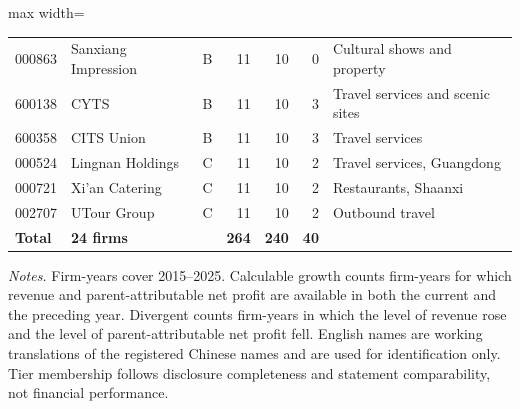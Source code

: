 \documentclass[review,3p,times]{elsarticle}
\begin{document}
\begin{table}[!htbp]
\begin{minipage}{\textwidth}
\begin{adjustbox}{max width=\textwidth}
\begin{tabular}{@{}lllrrrl@{}}
000863 & Sanxiang Impression & B & 11 & 10 & 0 & Cultural shows and property \\
600138 & CYTS & B & 11 & 10 & 3 & Travel services and scenic sites \\
600358 & CITS Union & B & 11 & 10 & 3 & Travel services \\
000524 & Lingnan Holdings & C & 11 & 10 & 2 & Travel services, Guangdong \\
000721 & Xi'an Catering & C & 11 & 10 & 2 & Restaurants, Shaanxi \\
002707 & UTour Group & C & 11 & 10 & 2 & Outbound travel \\
\textbf{Total} & \textbf{24 firms} &  & \textbf{264} & \textbf{240} & \textbf{40} &  \\
\bottomrule
\end{tabular}
\end{adjustbox}
\par\medskip
\raggedright
\noindent\textit{Notes.} Firm-years cover 2015--2025. Calculable growth counts firm-years for which revenue and parent-attributable net profit are available in both the current and the preceding year. Divergent counts firm-years in which the level of revenue rose and the level of parent-attributable net profit fell. English names are working translations of the registered Chinese names and are used for identification only. Tier membership follows disclosure completeness and statement comparability, not financial performance.
\end{minipage}
\end{table}
\end{document}
